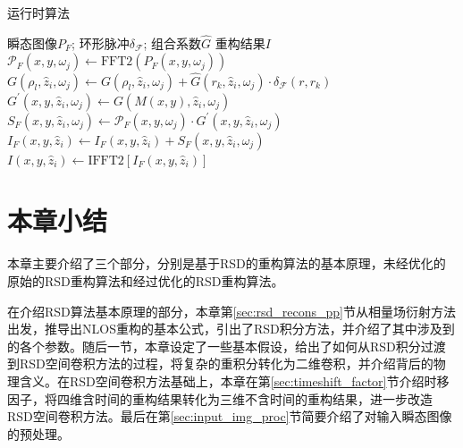 \documentclass[master]{shtthesis}             %
\begin{document}
\begin{algorithm*}[!t]
    \caption{运行时算法}
    \label{algo:rt}
    \begin{algorithmic}[1]
        \Require 瞬态图像$P_F$; 环形脉冲$\delta_{\mathcal{F}}$; 组合系数$\hat{G}$
        \Ensure 重构结果$I$
                \State $\mathcal{P}_F(x, y, \omega_j) \gets \text{FFT2}(P_F(x, y, \omega_j))$
                        \State $G(\rho_l, \hat{z}_i, \omega_j) \gets G(\rho_l, \hat{z}_i, \omega_j) + \hat{G}(r_k, \hat{z}_i, \omega_j)\cdot \delta_{\mathcal{F}}(r, r_k) $
                    \EndFor
                \EndFor
                 
                        \State $G^{\prime}(x, y, \hat{z}_i, \omega_j) \gets G(M(x, y), \hat{z}_i, \omega_j)$ 
                        \State $ S_F(x, y, \hat{z}_i, \omega_j) \gets \mathcal{P}_F(x, y, \omega_j) \cdot G^{\prime}(x, y, \hat{z}_i, \omega_j) $ 
                    \EndFor
                \EndFor
                \State $I_F(x, y, \hat{z}_i) \gets I_F(x, y, \hat{z}_i) + S_F(x, y, \hat{z}_i, \omega_j)$ 
            \EndFor
            \State $I(x, y, \hat{z}_i) \gets \text{IFFT2} \left[ I_F(x, y, \hat{z}_i) \right]$ \EndFor 
        \EndProcedure
    \end{algorithmic}
\end{algorithm*}

\section{本章小结}

本章主要介绍了三个部分，分别是基于RSD的重构算法的基本原理，未经优化的原始的RSD重构算法和经过优化的RSD重构算法。

在介绍RSD算法基本原理的部分，本章第\ref{sec:rsd_recons_pp}节从相量场衍射方法出发，推导出NLOS重构的基本公式，引出了RSD积分方法，并介绍了其中涉及到的各个参数。随后一节，本章设定了一些基本假设，给出了如何从RSD积分过渡到RSD空间卷积方法的过程，将复杂的重积分转化为二维卷积，并介绍背后的物理含义。在RSD空间卷积方法基础上，本章在第\ref{sec:timeshift_factor}节介绍时移因子，将四维含时间的重构结果转化为三维不含时间的重构结果，进一步改造RSD空间卷积方法。最后在第\ref{sec:input_img_proc}节简要介绍了对输入瞬态图像的预处理。
\end{document}
